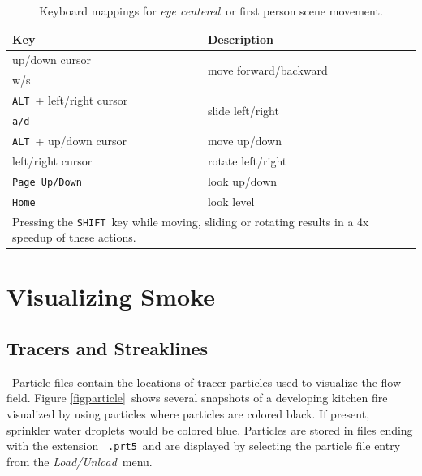 \documentclass[11pt,twoside]{book}
\newcommand{\figheight}{1.5in}
\begin{document}
\begin{table}[bph]
\begin{center}
\caption{Keyboard mappings for {\em eye centered}\ or first person scene movement.}
\vspace{0.1in}
\begin{tabular}{|l|l|}
\hline Key &   Description  \\

\hline\hline
up/down cursor & \multirow{2}{*}{move forward/backward}\  \\
w/s &   \\\hline
{\tt ALT}\ + left/right cursor  & \multirow{2}{*}{slide left/right}\ \\
{\tt a/d}\  &  \\ \hline
{\tt ALT}\ + up/down cursor  & move up/down  \\ \hline\hline
left/right cursor  & rotate left/right \\ \hline
{\tt Page Up/Down}\  & look up/down \\ \hline
{\tt Home}\  & look level \\ \hline\hline
\multicolumn{2}{|p{3.5in}|}{Pressing the {\tt SHIFT}\ key while moving, sliding or rotating
results in a  4x speedup of these actions. }\ \\ \hline

\end{tabular}
\label{tabKEYS}
\end{center}
\end{table}


\chapter{Visualizing Smoke}

\section{Tracers and Streaklines}

\renewcommand{\figheight}{1.4in}

\label{section:particles}\ Particle files contain the locations of
tracer particles used to visualize the flow field. Figure
\ref{figparticle}\ shows several snapshots of a developing kitchen
fire visualized by using particles where particles are colored
black. If present, sprinkler water droplets would be colored blue.
Particles are stored in files ending with the extension {\tt
.prt5}\ and are displayed by selecting the particle file entry from
the {\em Load/Unload}\ menu.
\end{document}
